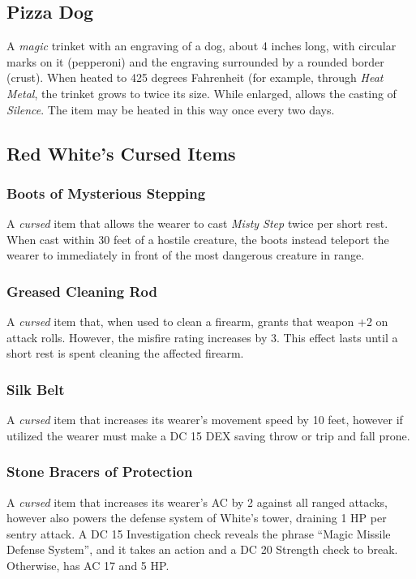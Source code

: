 \subsection{Pizza Dog}
\label{items:pizzadog}
A \textit{magic} trinket with an engraving of a dog, about 4 inches long, with circular marks on it (pepperoni) and the 	engraving surrounded by a rounded border (crust). When heated to 425 degrees Fahrenheit (for example, through \textit{Heat Metal}, the trinket grows to twice its size. While enlarged, allows the casting of \textit{Silence}. The item may be heated in this way once every two days.

\subsection{Red White's Cursed Items}

\subsubsection{Boots of Mysterious Stepping}
\label{items:boots}
A \textit{cursed} item that allows the wearer to cast \textit{Misty Step} twice per short rest. When cast within 30 feet of a hostile creature, the boots instead teleport the wearer to immediately in front of the most dangerous creature in range.

\subsubsection{Greased Cleaning Rod}
\label{items:rod}
A \textit{cursed} item that, when used to clean a firearm, grants that weapon +2 on attack rolls. However, the misfire rating increases by 3. This effect lasts until a short rest is spent cleaning the affected firearm.

\subsubsection{Silk Belt}
\label{items:silkbelt}
A \textit{cursed} item that increases its wearer's movement speed by 10 feet, however if utilized the wearer must make a DC 15 DEX saving throw or trip and fall prone.

\subsubsection{Stone Bracers of Protection}
\label{items:bracers}
A \textit{cursed} item that increases its wearer's AC by 2 against all ranged attacks, however also powers the defense system of White's tower, draining 1 HP per sentry attack. A DC 15 Investigation check reveals the phrase ``Magic Missile Defense System'', and it takes an action and a DC 20 Strength check to break. Otherwise, has AC 17 and 5 HP. 

